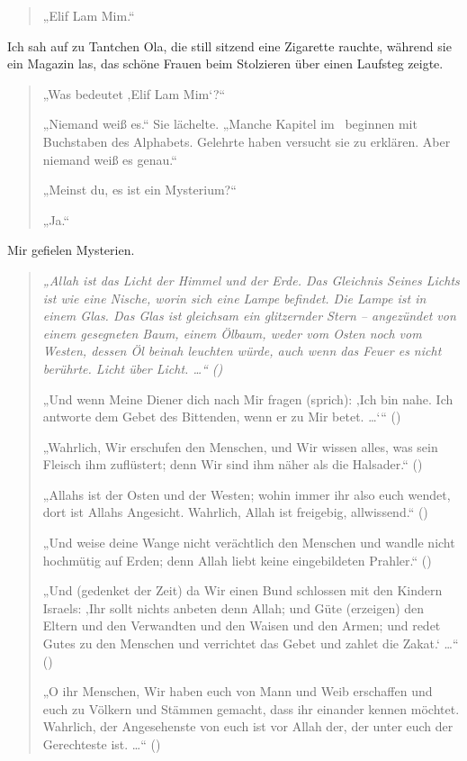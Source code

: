 \documentclass[12pt]{memoir}
\begin{document}
\begin{quote}
„Elif Lam Mim.“
\end{quote}

Ich sah auf zu Tantchen Ola, die still sitzend eine Zigarette rauchte,
während sie ein Magazin las,
das schöne Frauen beim Stolzieren über einen Laufsteg zeigte.

\begin{quote}
„Was bedeutet ‚Elif Lam Mim‘?“

„Niemand weiß es.“ Sie lächelte.
„Manche Kapitel im \Quran\ beginnen mit Buchstaben des Alphabets.
Gelehrte haben versucht sie zu erklären.
Aber niemand weiß es genau.“

„Meinst du, es ist ein Mysterium?“

„Ja.“
\end{quote}

Mir gefielen Mysterien.

\begin{quote}
\itshape
„Allah ist das Licht der Himmel und der Erde.
Das Gleichnis Seines Lichts ist wie eine Nische,
worin sich eine Lampe befindet.
Die Lampe ist in einem Glas.
Das Glas ist gleichsam ein glitzernder Stern –
angezündet von einem gesegneten Baum, einem Ölbaum,
weder vom Osten noch vom Westen, dessen Öl beinah leuchten würde,
auch wenn das Feuer es nicht berührte.
Licht über Licht. …“
()

„Und wenn Meine Diener dich nach Mir fragen (sprich):
‚Ich bin nahe. Ich antworte dem Gebet des Bittenden, wenn er zu Mir betet. …‘“
()

„Wahrlich, Wir erschufen den Menschen, und Wir wissen alles,
was sein Fleisch ihm zuflüstert; denn Wir sind ihm näher als die Halsader.“
()

„Allahs ist der Osten und der Westen; wohin immer ihr also euch wendet,
dort ist Allahs Angesicht. Wahrlich, Allah ist freigebig, allwissend.“
()

„Und weise deine Wange nicht verächtlich den Menschen
und wandle nicht hochmütig auf Erden;
denn Allah liebt keine eingebildeten Prahler.“
()

„Und (gedenket der Zeit) da Wir einen Bund schlossen mit den Kindern Israels:
‚Ihr sollt nichts anbeten denn Allah;
und Güte (erzeigen) den Eltern und den Verwandten und den Waisen und den Armen;
und redet Gutes zu den Menschen
und verrichtet das Gebet und zahlet die Zakat.‘ …“
()

„O ihr Menschen, Wir haben euch von Mann und Weib erschaffen
und euch zu Völkern und Stämmen gemacht, dass ihr einander kennen möchtet.
Wahrlich, der Angesehenste von euch ist vor Allah der,
der unter euch der Gerechteste ist. …“
()
\end{quote}
\end{document}
